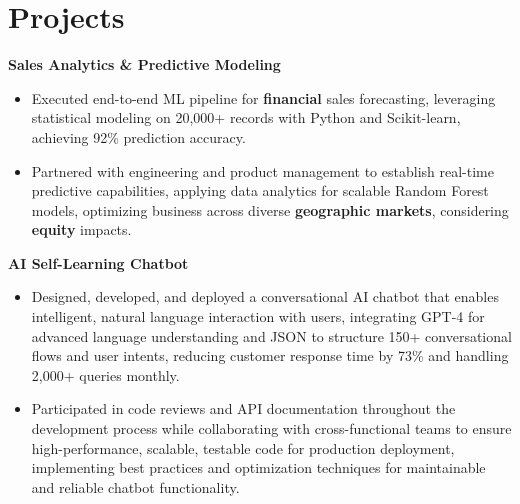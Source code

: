 \documentclass[a4paper,10pt]{article}
\begin{document}
\vspace{-4mm}

\section*{Projects}
\textbf{Sales Analytics \& Predictive Modeling} \\
\begin{itemize}[leftmargin=*, itemsep=0pt, parsep=1pt]
\vspace{-7mm}
    \item Executed end-to-end ML pipeline for \textbf{financial} sales forecasting, leveraging statistical modeling on 20,000+ records with Python and Scikit-learn, achieving 92\% prediction accuracy.
    \item Partnered with engineering and product management to establish real-time predictive capabilities, applying data analytics for scalable Random Forest models, optimizing business across diverse \textbf{geographic markets}, considering \textbf{equity} impacts.
    \end{itemize}

\vspace{-2mm}
\textbf{AI Self-Learning Chatbot} \\
\begin{itemize}[leftmargin=*, itemsep=0pt, parsep=1pt]
\vspace{-7mm}
    \item Designed, developed, and deployed a conversational AI chatbot that enables intelligent, natural language interaction with users, integrating GPT-4 for advanced language understanding and JSON to structure 150+ conversational flows and user intents, reducing customer response time by 73\% and handling 2,000+ queries monthly.
    \item Participated in code reviews and API documentation throughout the development process while collaborating with cross-functional teams to ensure high-performance, scalable, testable code for production deployment, implementing best practices and optimization techniques for maintainable and reliable chatbot functionality.
\end{itemize}

\vspace{-2mm}
\end{document}
